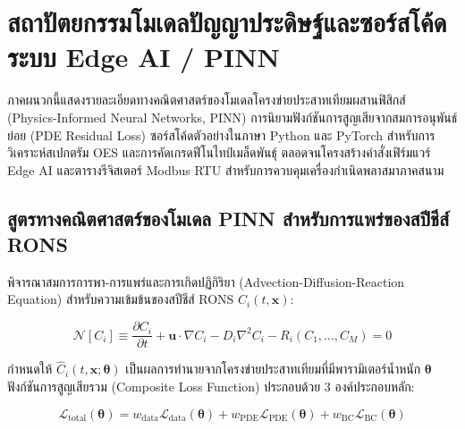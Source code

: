 
\chapter{สถาปัตยกรรมโมเดลปัญญาประดิษฐ์และซอร์สโค้ดระบบ Edge AI / PINN}
\label{app:ai_pinn_architecture}

ภาคผนวกนี้แสดงรายละเอียดทางคณิตศาสตร์ของโมเดลโครงข่ายประสาทเทียมผสานฟิสิกส์ (Physics-Informed Neural Networks, PINN) การนิยามฟังก์ชันการสูญเสียจากสมการอนุพันธ์ย่อย (PDE Residual Loss) ซอร์สโค้ดตัวอย่างในภาษา Python และ PyTorch สำหรับการวิเคราะห์สเปกตรัม OES และการคัดเกรดฟีโนไทป์เมล็ดพันธุ์ ตลอดจนโครงสร้างคำสั่งเฟิร์มแวร์ Edge AI และตารางรีจิสเตอร์ Modbus RTU สำหรับการควบคุมเครื่องกำเนิดพลาสมาภาคสนาม

\section{สูตรทางคณิตศาสตร์ของโมเดล PINN สำหรับการแพร่ของสปีชีส์ RONS}
\label{app:sec_pinn_math}

พิจารณาสมการการพา-การแพร่และการเกิดปฏิกิริยา (Advection-Diffusion-Reaction Equation) สำหรับความเข้มข้นของสปีชีส์ RONS $C_i(t, \mathbf{x})$:

\begin{equation}
\label{eq:app_pinn_adr}
\mathcal{N}[C_i] \equiv \frac{\partial C_i}{\partial t} + \mathbf{u} \cdot \nabla C_i - D_i \nabla^2 C_i - R_i(C_1, \dots, C_M) = 0
\end{equation}

กำหนดให้ $\hat{C}_i(t, \mathbf{x}; \boldsymbol{\theta})$ เป็นผลการทำนายจากโครงข่ายประสาทเทียมที่มีพารามิเตอร์น้ำหนัก $\boldsymbol{\theta}$ ฟังก์ชันการสูญเสียรวม (Composite Loss Function) ประกอบด้วย 3 องค์ประกอบหลัก:

\begin{equation}
\label{eq:app_pinn_loss_total}
\mathcal{L}_{\text{total}}(\boldsymbol{\theta}) = w_{\text{data}} \mathcal{L}_{\text{data}}(\boldsymbol{\theta}) + w_{\text{PDE}} \mathcal{L}_{\text{PDE}}(\boldsymbol{\theta}) + w_{\text{BC}} \mathcal{L}_{\text{BC}}(\boldsymbol{\theta})
\end{equation}

